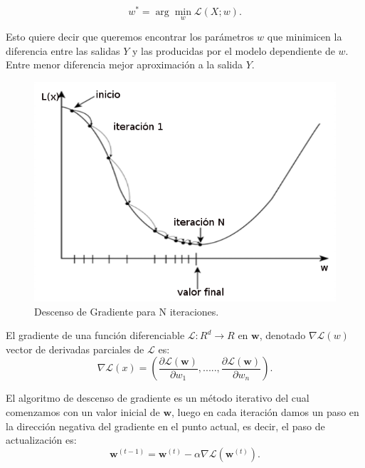 \begin{equation}
w^* =  \arg\min_{w} \mathcal{L}(X; w).
\end{equation}

Esto quiere decir que queremos encontrar los parámetros $w$ que minimicen la diferencia entre las salidas $Y$ y las producidas por el modelo dependiente de $w$. Entre menor  diferencia mejor aproximación a la salida $Y$. 

\begin{figure}[H] \centering
  \includegraphics[scale=0.4,keepaspectratio=true,clip=true]{imagenes/MarcoTeorico/gradient-descent.png}
  \caption{Descenso de Gradiente para N iteraciones.}\label{Fig:gradient-descent}
\end{figure}


El gradiente de una función diferenciable $ \mathcal{L}: R^d \longrightarrow R $ en $\textbf{w}$, denotado $ \nabla \mathcal{L}(w) $ vector de derivadas parciales de $\mathcal{L}$ es:
\begin{equation}
\nabla \mathcal{L}(x) = (\frac{\partial \mathcal{L}(\textbf{w})}{\partial w_1},....., \frac{\partial \mathcal{L}(\textbf{w})}{\partial w_n}).
\end{equation}

El algoritmo de descenso de gradiente es un método iterativo del cual comenzamos con un valor inicial de $\textbf{w}$, luego en cada iteración damos un paso en la dirección negativa del gradiente en el punto actual, es decir, el paso de actualización es:
\begin{equation}
\textbf{w}^{(t-1)} = \textbf{w}^{(t)} - \alpha \nabla \mathcal{L}(\textbf{w}^{(t)}).
\end{equation}


